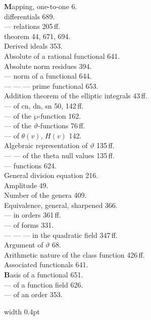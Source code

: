 \noindent
\begin{minipage}[t]{0.48\textwidth}
\noindent
\textbf{M}apping, one-to-one 6. \\
 differentials 689. \\
--- relations 205\,ff. \\
 theorem 44, 671, 694. \\
Derived ideals 353. \\
Absolute of a rational functional 641. \\
Absolute norm residues 394. \\
--- norm of a functional 644. \\
--- --- --- prime functional 653. \\
Addition theorem of the elliptic integrals 43\,ff. \\
--- of cn, dn, sn 50, 142\,ff. \\
--- of the $\wp$-function 162. \\
--- of the $\vartheta$-functions 76\,ff. \\
--- of $\theta(v)$, $H(v)$ 142. \\
Algebraic representation of $\vartheta$ 135\,ff. \\
--- --- of the theta null values 135\,ff. \\
--- functions 624. \\
General division equation 216. \\
Amplitude 49. \\
Number of the genera 409. \\
Equivalence, general, sharpened 366. \\
--- in orders 361\,ff. \\
--- of forms 331. \\
--- --- --- in the quadratic field 347\,ff. \\
Argument of $\vartheta$ 68. \\
Arithmetic nature of the class function 426\,ff. \\
Associated functionals 641. \\[4pt]
\textbf{B}asis of a functional 651. \\
--- of a function field 626. \\
--- of an order 353.
\end{minipage}%
\hfill\vrule width 0.4pt\hfill
